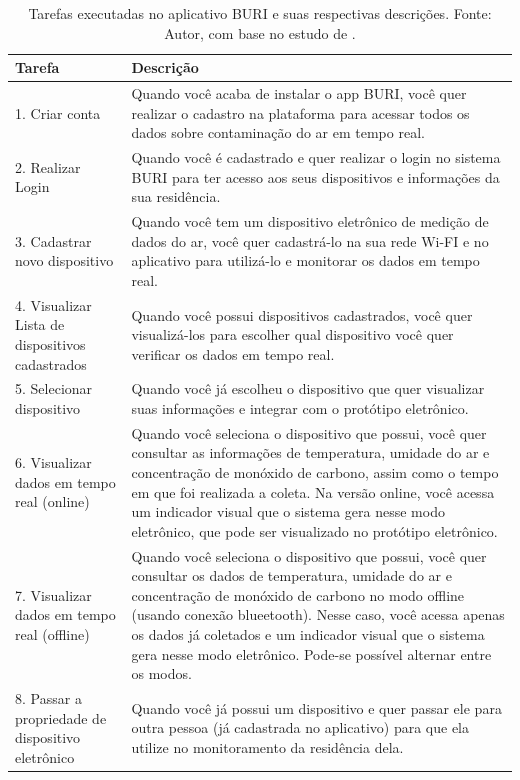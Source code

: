 \begin{table}[htbp]
    \centering
    \caption{Tarefas executadas no aplicativo BURI e suas respectivas descrições. Fonte: Autor, com base no estudo de \cite{ufam-design}.}\label{tab:cenarios-de-uso}
    \begin{tabular}{p{4cm}|p{10cm}}
    \toprule
    \textbf{Tarefa} & \textbf{Descrição} \\ \midrule
    1. Criar conta & Quando você acaba de instalar o app BURI, você quer realizar o cadastro na plataforma para acessar todos os dados sobre contaminação do ar em tempo real. \\ \midrule
    2. Realizar Login & Quando você é cadastrado e quer realizar o login no sistema BURI para ter acesso aos seus dispositivos e informações da sua residência. \\ \midrule
    3. Cadastrar novo dispositivo & Quando você tem um dispositivo eletrônico de medição de dados do ar, você quer cadastrá-lo na sua rede Wi-FI e no aplicativo para utilizá-lo e monitorar os dados em tempo real. \\ \midrule
    4. Visualizar Lista de dispositivos cadastrados & Quando você possui dispositivos cadastrados, você quer visualizá-los para escolher qual dispositivo você quer verificar os dados em tempo real. \\ \midrule
    5. Selecionar dispositivo & Quando você já escolheu o dispositivo que quer visualizar suas informações e integrar com o protótipo eletrônico. \\ \midrule
    6. Visualizar dados em tempo real (online) & Quando você seleciona o dispositivo que possui, você quer consultar as informações de temperatura, umidade do ar e concentração de monóxido de carbono, assim como o tempo em que foi realizada a coleta. Na versão online, você acessa um indicador visual que o sistema gera nesse modo eletrônico, que pode ser visualizado no protótipo eletrônico. \\ \midrule
    7. Visualizar dados em tempo real (offline) & Quando você seleciona o dispositivo que possui, você quer consultar os dados de temperatura, umidade do ar e concentração de monóxido de carbono no modo offline (usando conexão blueetooth). Nesse caso, você acessa apenas os dados já coletados e um indicador visual que o sistema gera nesse modo eletrônico. Pode-se possível alternar entre os modos. \\ \midrule
    8. Passar a propriedade de dispositivo eletrônico & Quando você já possui um dispositivo e quer passar ele para outra pessoa (já cadastrada no aplicativo) para que ela utilize no monitoramento da residência dela. \\ \bottomrule
    \end{tabular}
\end{table}

